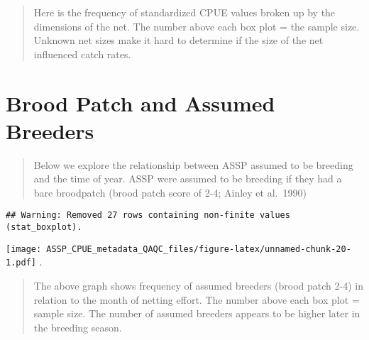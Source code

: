 \documentclass[
]{article}
\newenvironment{Shaded}{\begin{snugshade}}{\end{snugshade}}
\newcommand{\DataTypeTok}[1]{\textcolor[rgb]{0.13,0.29,0.53}{#1}}
\newcommand{\DecValTok}[1]{\textcolor[rgb]{0.00,0.00,0.81}{#1}}
\newcommand{\KeywordTok}[1]{\textcolor[rgb]{0.13,0.29,0.53}{\textbf{#1}}}
\newcommand{\NormalTok}[1]{#1}
\newcommand{\OperatorTok}[1]{\textcolor[rgb]{0.81,0.36,0.00}{\textbf{#1}}}
\newcommand{\OtherTok}[1]{\textcolor[rgb]{0.56,0.35,0.01}{#1}}
\newcommand{\StringTok}[1]{\textcolor[rgb]{0.31,0.60,0.02}{#1}}
\begin{document}
\begin{quote}
Here is the frequency of standardized CPUE values broken up by the
dimensions of the net. The number above each box plot = the sample size.
Unknown net sizes make it hard to determine if the size of the net
influenced catch rates.
\end{quote}

\hypertarget{brood-patch-and-assumed-breeders}{%
\section{Brood Patch and Assumed
Breeders}\label{brood-patch-and-assumed-breeders}}

\begin{quote}
Below we explore the relationship between ASSP assumed to be breeding
and the time of year. ASSP were assumed to be breeding if they had a
bare broodpatch (brood patch score of 2-4; Ainley et al.~1990)
\end{quote}

\begin{Shaded}
\end{Shaded}

\begin{verbatim}
## Warning: Removed 27 rows containing non-finite values (stat_boxplot).
\end{verbatim}

\texttt{[image: ASSP\_CPUE\_metadata\_QAQC\_files/figure-latex/unnamed-chunk-20-1.pdf]}
.

\begin{quote}
The above graph shows frequency of assumed breeders (brood patch 2-4) in
relation to the month of netting effort. The number above each box plot
= sample size. The number of assumed breeders appears to be higher later
in the breeding season.
\end{quote}
\end{document}
